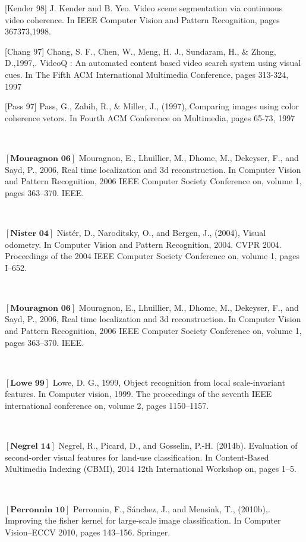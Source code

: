 [Kender 98] J. Kender and B. Yeo. Video scene segmentation via continuous video coherence. In
IEEE Computer Vision and Pattern Recognition, pages 367373,1998.

[Chang 97] Chang, S. F., Chen, W., Meng, H. J., Sundaram, H., \& Zhong, D.,1997,. VideoQ : An
automated content based video search system using visual cues. In The Fifth ACM
International Multimedia Conference, pages 313-324, 1997

[Pass 97] Pass, G., Zabih, R., \& Miller, J., (1997),.Comparing images using color coherence vetors.
In Fourth ACM Conference on Multimedia, pages 65-73, 1997

\

$\left[\textbf{Mouragnon 06}\right]$ Mouragnon, E., Lhuillier, M., Dhome, M., Dekeyser, F., and Sayd, P., 2006, Real
time localization and 3d reconstruction. In Computer Vision and Pattern Recognition, 2006
IEEE Computer Society Conference on, volume 1, pages 363–370. IEEE.

\

$\left[\textbf{Nister 04}\right]$ Nistér, D., Naroditsky, O., and Bergen, J., (2004), Visual odometry. In Computer Vision and Pattern Recognition, 2004. CVPR 2004. Proceedings of the 2004 IEEE Computer
Society Conference on, volume 1, pages I–652.

\

$\left[\textbf{Mouragnon 06}\right]$ Mouragnon, E., Lhuillier, M., Dhome, M., Dekeyser, F., and Sayd, P., 2006, Real
time localization and 3d reconstruction. In Computer Vision and Pattern Recognition, 2006
IEEE Computer Society Conference on, volume 1, pages 363–370. IEEE.

\

$\left[\textbf{Lowe 99}\right]$ Lowe, D. G., 1999, Object recognition from local scale-invariant features. In Computer
vision, 1999. The proceedings of the seventh IEEE international conference on, volume 2,
pages 1150–1157.

\

$\left[\textbf{Negrel 14}\right]$ Negrel, R., Picard, D., and Gosselin, P.-H. (2014b). Evaluation of second-order visual features for land-use classification. In Content-Based Multimedia Indexing (CBMI), 2014
12th International Workshop on, pages 1–5.

\

$\left[\textbf{Perronnin 10}\right]$ Perronnin, F., Sánchez, J., and Mensink, T., (2010b),. Improving the fisher kernel for large-scale image classification. In Computer Vision–ECCV 2010, pages 143–156. Springer.

